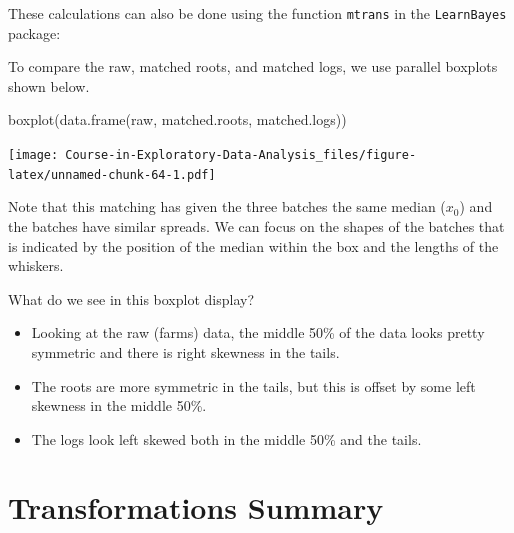 \documentclass[
]{book}
\newenvironment{Shaded}{\begin{snugshade}}{\end{snugshade}}
\newcommand{\DecValTok}[1]{\textcolor[rgb]{0.00,0.00,0.81}{#1}}
\newcommand{\FloatTok}[1]{\textcolor[rgb]{0.00,0.00,0.81}{#1}}
\newcommand{\FunctionTok}[1]{\textcolor[rgb]{0.00,0.00,0.00}{#1}}
\newcommand{\NormalTok}[1]{#1}
\newcommand{\OtherTok}[1]{\textcolor[rgb]{0.56,0.35,0.01}{#1}}
\newcommand{\SpecialCharTok}[1]{\textcolor[rgb]{0.00,0.00,0.00}{#1}}
\providecommand{\tightlist}{%
  \setlength{\itemsep}{0pt}\setlength{\parskip}{0pt}}
\begin{document}
These calculations can also be done using the function \texttt{mtrans} in the \texttt{LearnBayes} package:

\begin{Shaded}
\end{Shaded}

To compare the raw, matched roots, and matched logs, we use parallel boxplots shown below.

\begin{Shaded}
\begin{Highlighting}[]
\FunctionTok{boxplot}\NormalTok{(}\FunctionTok{data.frame}\NormalTok{(raw, matched.roots, matched.logs))}
\end{Highlighting}
\end{Shaded}

\texttt{[image: Course-in-Exploratory-Data-Analysis\_files/figure-latex/unnamed-chunk-64-1.pdf]}

Note that this matching has given the three batches the same median (\(x_0\)) and the batches have similar spreads. We can focus on the shapes of the batches that is indicated by the position of the median within the box and the lengths of the whiskers.

What do we see in this boxplot display?

\begin{itemize}
\tightlist
\item
  Looking at the raw (farms) data, the middle 50\% of the data looks pretty symmetric and there is right skewness in the tails.
\item
  The roots are more symmetric in the tails, but this is offset by some left skewness in the middle 50\%.
\item
  The logs look left skewed both in the middle 50\% and the tails.
\end{itemize}

\hypertarget{transformations-summary}{%
\chapter{Transformations Summary}\label{transformations-summary}}
\end{document}

